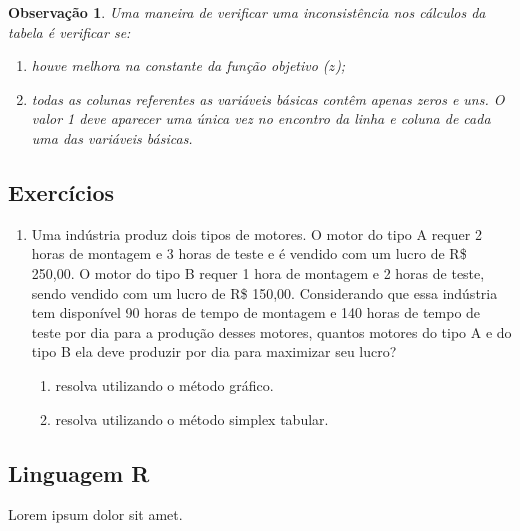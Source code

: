 \documentclass[
	12pt,				%
	openright,			%
	twoside,			%
	a4paper,			%
	english,			%
	french,				%
	brazil,				%
	sumario=tradicional
]{abntex2}
\newtheorem{remark}{Observação}
\numberwithin{example}{chapter}
\numberwithin{remark}{chapter}
\numberwithin{definition}{chapter}
\numberwithin{figure}{chapter}
\begin{document}
\begin{remark}
    Uma maneira de verificar uma inconsistência nos cálculos da tabela é verificar se:
    \begin{enumerate}
        \item houve melhora na constante da função objetivo ($z$);
        \item todas as colunas referentes as variáveis básicas contêm apenas zeros e uns. O valor 1 deve aparecer uma única vez no encontro da linha e coluna de cada uma das variáveis básicas.
    \end{enumerate}
\end{remark}

\section{Exercícios}

\begin{enumerate}
	\item Uma indústria produz dois tipos de motores. O motor do tipo A requer 2 horas de montagem e 3 horas de teste e é vendido com um lucro de R\$ 250,00. O motor do tipo B requer 1 hora de montagem e 2 horas de teste, sendo vendido com um lucro de R\$ 150,00. Considerando que essa indústria tem disponível 90 horas de tempo de montagem e 140 horas de tempo de teste por dia para a produção desses motores, quantos motores do tipo A e do tipo B ela deve produzir por dia para maximizar seu lucro?
	\begin{enumerate}
	    \item resolva utilizando o método gráfico.
	
	    \item resolva utilizando o método simplex tabular.
	\end{enumerate}
\end{enumerate}

\begin{apendicesenv}
	\partapendices
	
	\chapter{Linguagem R}
	
	Lorem ipsum dolor sit amet.
	
	
\end{apendicesenv}
\end{document}

